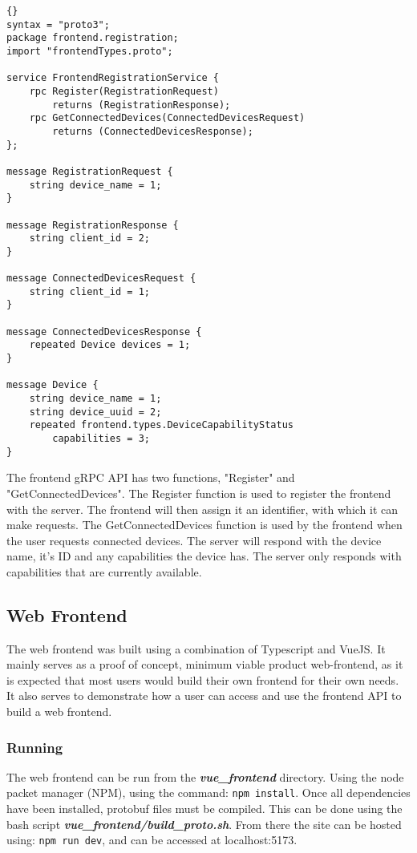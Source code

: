 \begin{lstlisting}[language=protobuf3, style=boxed, showstringspaces=false]{}
syntax = "proto3";
package frontend.registration;
import "frontendTypes.proto";

service FrontendRegistrationService {
    rpc Register(RegistrationRequest) 
        returns (RegistrationResponse);
    rpc GetConnectedDevices(ConnectedDevicesRequest)
        returns (ConnectedDevicesResponse);
};

message RegistrationRequest {
    string device_name = 1;
}

message RegistrationResponse {
    string client_id = 2;
}

message ConnectedDevicesRequest {
    string client_id = 1;
}

message ConnectedDevicesResponse {
    repeated Device devices = 1;
}

message Device {
    string device_name = 1;
    string device_uuid = 2;
    repeated frontend.types.DeviceCapabilityStatus 
        capabilities = 3;
}
\end{lstlisting}
The frontend gRPC API has two functions, "Register" and "GetConnectedDevices". The Register function is used to register the frontend with the server. The frontend will then assign it an identifier, with which it can make requests. The GetConnectedDevices function is used by the frontend when the user requests connected devices. The server will respond with the device name, it's ID and any capabilities the device has. The server only responds with capabilities that are currently available.

\subsection{Web Frontend} \label{sec:chapimpl:frontend:web}
The web frontend was built using a combination of Typescript and VueJS. It mainly serves as a proof of concept, minimum viable product web-frontend, as it is expected that most users would build their own frontend for their own needs. It also serves to demonstrate how a user can access and use the frontend API to build a web frontend.

\subsubsection{Running}
The web frontend can be run from the \textit{\textbf{vue\_frontend}} directory. Using the node packet manager (NPM), using the command: \verb|npm install|. Once all dependencies have been installed, protobuf files must be compiled. This can be done using the bash script \textit{\textbf{vue\_frontend/build\_proto.sh}}. From there the site can be hosted using: \verb|npm run dev|, and can be accessed at \mbox{localhost:5173}.

